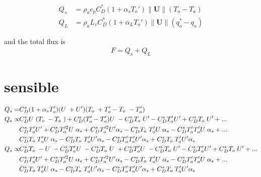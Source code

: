 \documentclass[12pt,a4paper]{article}
\newcommand{\Vmag}[1]{\| \mathbf{#1}\|}
\newcommand{\Ub}{U\hspace*{1mm}}
\newcommand{\Up}{U'}
\newcommand{\To}{T_o\hspace*{1mm}}
\newcommand{\Top}{T_o'}
\newcommand{\Ta}{T_a\hspace*{1mm}}
\newcommand{\Tap}{T_a'}
\newcommand{\CDs}{C_D^s}
\begin{document}
\begin{align}
Q_s &= \rho_a c_p C_D^*(1+\alpha_s T_o') \Vmag{U} (T_o-T_a)\\
Q_L &= \rho_a L_v C_D^*(1+\alpha_L T_o') \Vmag{U} (q_o^*-q_a)
\end{align}

and the total flux is 
\begin{align}
F = Q_s + Q_L
\end{align}



\section*{sensible}
\begin{align*}
Q_s = &\CDs(1+\alpha_s \Top) (\Ub+\Up) (\To + \Top -\Ta - \Tap)\\
Q_s \propto & \CDs \Ub (\To -\Ta )+\CDs (\Top -\Tap )\Ub -\CDs \Ta \Up -\CDs \Tap \Up +\CDs \To \Up +...\\
&\CDs\Top\Up+\CDs\Top^2\Ub\alpha_s+\CDs\Top^2\Up\alpha_s-\CDs\Ta\Top\Ub\alpha_s-\CDs\Tap\Top\Ub\alpha_s+...\\
&\CDs\To\Top\Ub\alpha_s-\CDs\Ta\Top\Up\alpha_s-\CDs\Tap\Top\Up\alpha_s+\CDs\To\Top\Up\alpha_s\\
Q_s \propto &\CDs\To-\Ub-\CDs\Tap\Ub-\CDs\Ta\Ub+\CDs\Top\Ub-\CDs\Ta\Up-\CDs\Tap\Up+\CDs\To\Up+...\\
&\CDs\Top\Up+\CDs\Top^2\Ub\alpha_s+\CDs\Top^2\Up\alpha_s-\CDs\Ta\Top\Ub\alpha_s-\CDs\Tap\Top\Ub\alpha_s+...\\
&\CDs\To\Top\Ub\alpha_s-\CDs\Ta\Top\Up\alpha_s-\CDs\Tap\Top\Up\alpha_s+\CDs\To\Top\Up\alpha_s\\
\end{align*}
\end{document}
